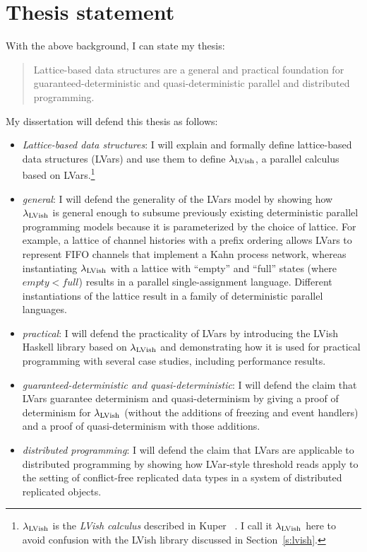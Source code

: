 \documentclass{article}
\begin{document}

\section{Thesis statement}\label{s:thesis}


With the above background, I can state my thesis:
\begin{quote}
  Lattice-based data structures are a general and practical foundation
  for guaranteed-deterministic and quasi-deterministic parallel and
  distributed programming.
\end{quote}
My dissertation will defend this thesis as follows:
\begin{itemize}
  \item \emph{Lattice-based data structures}: I will explain and
    formally define lattice-based data structures (LVars) and use them
    to define $\lambda_{\textrm{LVish}}$, a parallel calculus based on
    LVars.\footnote{$\lambda_{\textrm{LVish}}$ is the \emph{LVish calculus}
      described in Kuper \etal~\cite{Freeze-paper}.  I call it
      $\lambda_{\textrm{LVish}}$ here to avoid confusion with the LVish library
      discussed in Section~\ref{s:lvish}.}

  \item \emph{general}: I will defend the generality of the LVars
    model by showing how $\lambda_{\textrm{LVish}}$ is general enough to subsume
    previously existing deterministic parallel programming models
    because it is parameterized by the choice of lattice.  For
    example, a lattice of channel histories with a prefix ordering
    allows LVars to represent FIFO channels that implement a Kahn
    process network, whereas instantiating $\lambda_{\textrm{LVish}}$ with a
    lattice with ``empty'' and ``full'' states (where $\mathit{empty}
    < \mathit{full}$) results in a parallel single-assignment
    language.  Different instantiations of the lattice result in a
    family of deterministic parallel languages.

  \item \emph{practical}: I will defend the practicality of LVars by
    introducing the LVish Haskell library based on $\lambda_{\textrm{LVish}}$ and
    demonstrating how it is used for practical programming with
    several case studies, including performance results.

  \item \emph{guaranteed-deterministic and quasi-deterministic}: I
    will defend the claim that LVars guarantee determinism and
    quasi-determinism by giving a proof of determinism for
    $\lambda_{\textrm{LVish}}$ (without the additions of freezing and event
    handlers) and a proof of quasi-determinism with those additions.

  \item \emph{distributed programming}: I will defend the claim that
    LVars are applicable to distributed programming by showing how
    LVar-style threshold reads apply to the setting of conflict-free
    replicated data types in a system of distributed replicated
    objects.
\end{itemize}
\end{document}
